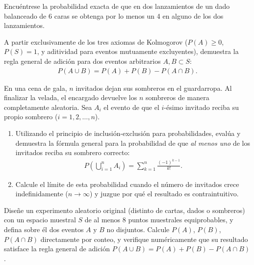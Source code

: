 \begin{problema}
	\label{prob:69a20ec}
	Encuéntrese la probabilidad exacta de que en dos lanzamientos de un dado balanceado de 6 caras se obtenga por lo menos un 4 en alguno de los dos lanzamientos.
\end{problema}

\begin{problema}
	\label{prob:1f335a1}
	A partir exclusivamente de los tres axiomas de Kolmogorov ($P(A) \ge 0$, $P(S)=1$, y aditividad para eventos mutuamente excluyentes), demuestra la regla general de adición para dos eventos arbitrarios $A, B \subset S$:
	\begin{align}
		P(A \cup B) = P(A) + P(B) - P(A \cap B).
	\end{align}
\end{problema}

\begin{problema}
	\label{prob:a4ff50c}
	En una cena de gala, $n$ invitados dejan sus sombreros en el guardarropa. Al finalizar la velada, el encargado devuelve los $n$ sombreros de manera completamente aleatoria. Sea $A_{i}$ el evento de que el $i$-ésimo invitado reciba su propio sombrero ($i=1,2,\dots,n$).
	\begin{enumerate}
		\item Utilizando el principio de inclusión-exclusión para probabilidades, evalúa y demuestra la fórmula general para la probabilidad de que \emph{al menos uno} de los invitados reciba su sombrero correcto:
		\begin{align}
			P\left( \bigcup_{i=1}^{n} A_{i} \right) = \sum_{k=1}^{n} \frac{(-1)^{k-1}}{k!}.
		\end{align}
		\item Calcule el límite de esta probabilidad cuando el número de invitados crece indefinidamente ($n \to \infty$) y juzgue por qué el resultado es contraintuitivo.
	\end{enumerate}
\end{problema}

\begin{problema}
	\label{prob:b993271}
	Diseñe un experimento aleatorio original (distinto de cartas, dados o sombreros) con un espacio muestral $S$ de al menos 8 puntos muestrales equiprobables, y defina sobre él dos eventos $A$ y $B$ no disjuntos. Calcule $P(A)$, $P(B)$, $P(A \cap B)$ directamente por conteo, y verifique numéricamente que su resultado satisface la regla general de adición $P(A \cup B) = P(A) + P(B) - P(A \cap B)$.
\end{problema}

